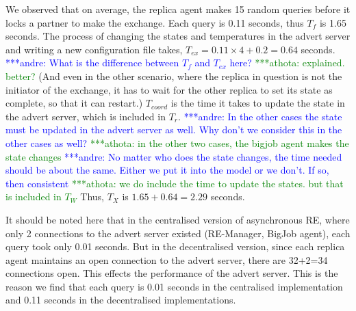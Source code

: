\documentclass{rspublic}
\newcommand{\alnote}[1]{ {\textcolor{blue} { ***andre: #1 }}}
\newcommand{\athotanote}[1]{ {\textcolor{green} { ***athota: #1 }}}
\newcommand{\alnote}[1]{}
\newcommand{\athotanote}[1]{}
\begin{document}
{We observed that on average, the replica agent makes 15 random queries
before it locks a partner to make the exchange. 
Each query is 0.11 seconds, thus $T_f$ is 1.65 seconds. The process of
changing the states and temperatures in the advert server and writing
a new configuration file takes, $T_{ex} = 0.11\times 4 +0.2 = 0.64$
seconds.  \alnote{What is the difference between $T_f$ and $T_{ex}$
  here?} \athotanote{explained. better?}  (And even in the other
scenario, where the replica in question is not the initiator of the
exchange, it has to wait for the other replica to set its state as
complete, so that it can restart.) $T_{coord}$ is the time it takes to
update the state in the advert server, which is included in
$T_r$. \alnote{In the other cases the state must be updated in the
  advert server as well. Why don't we consider this in the other cases
  as well?}\athotanote{in the other two cases, the bigjob agent makes
  the state changes} \alnote{No matter who does the state changes, the
  time needed should be about the same. Either we put it into the
  model or we don't. If so, then consistent} \athotanote{we do include
  the time to update the states. but that is included in $T_W$} Thus,
$T_{X}$ is $1.65+0.64= 2.29$ seconds.

It should be noted here that in the centralised version of
asynchronous RE, where only 2 connections to the advert server existed
(RE-Manager, BigJob agent), each query took only 0.01 seconds. But in
the decentralised version, since each replica agent maintains an open
connection to the advert server, there are 32+2=34 connections
open. This effects the performance of the advert server. This is the
reason we find that each query is 0.01 seconds in the centralised
implementation and 0.11 seconds in the decentralised
implementations. 


}
\end{document}
